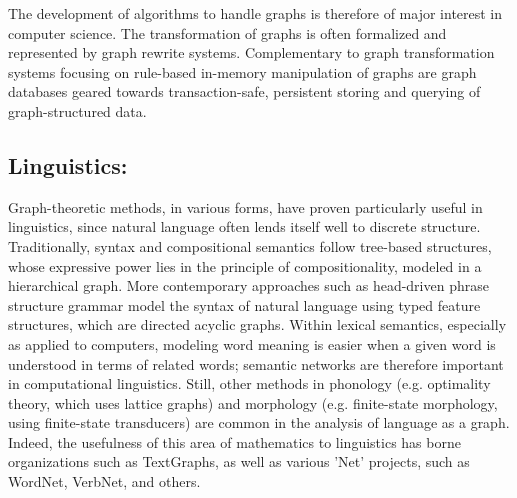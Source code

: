 \documentclass[12pt,letterpaper]{report}
\begin{document}
{ The development of algorithms to handle graphs is therefore of major interest in computer science. The transformation of graphs is often formalized and represented by graph rewrite systems. Complementary to graph transformation systems focusing on rule-based in-memory manipulation of graphs are graph databases geared towards transaction-safe, persistent storing and querying of graph-structured data.
\subsection{{\color{blue} Linguistics:}}Graph-theoretic methods, in various forms, have proven particularly useful in linguistics, since natural language often lends itself well to discrete structure. Traditionally, syntax and compositional semantics follow tree-based structures, whose expressive power lies in the principle of compositionality, modeled in a hierarchical graph. More contemporary approaches such as head-driven phrase structure grammar model the syntax of natural language using typed feature structures, which are directed acyclic graphs. Within lexical semantics, especially as applied to computers, modeling word meaning is easier when a given word is understood in terms of related words; semantic networks are therefore important in computational linguistics. Still, other methods in phonology (e.g. optimality theory, which uses lattice graphs) and morphology (e.g. finite-state morphology, using finite-state transducers) are common in the analysis of language as a graph. Indeed, the usefulness of this area of mathematics to linguistics has borne organizations such as TextGraphs, as well as various 'Net' projects, such as WordNet, VerbNet, and others.
}
\end{document}

